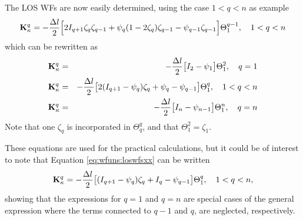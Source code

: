 The LOS WFs are now easily determined, using the case $1<q<n$ as example
 \begin{equation}
   \mathbf{K}_{\kappa}^q = -\frac{\Delta l}{2} \Big[ 2I_{q+1}\zeta_q\zeta_{q-1}+
     \psi_q(1-2\zeta_q)\zeta_{q-1} - \psi_{q-1}\zeta_{q-1} \Big] \Theta^{q-1}_1, 
     \quad 1<q<n
 \end{equation}
 which can be rewritten as
 \begin{eqnarray}
   \mathbf{K}_{\kappa}^q &=& -\frac{\Delta l}{2} \big[ I_2-\psi_1 \big] \Theta^2_1, \quad q=1 \nonumber \\
   \mathbf{K}_{\kappa}^q &=& -\frac{\Delta l}{2} \big[ 2(I_{q+1}-\psi_q)\zeta_q+
           \psi_q-\psi_{q-1} \big] \Theta^q_1, \quad 1<q<n 
  \label{eq:wfuns:loswfsxx} \\
   \mathbf{K}_{\kappa}^q &=& -\frac{\Delta l}{2} \big[ I_n-\psi_{n-1} \big] \Theta^n_1, \quad q=n \nonumber
 \end{eqnarray}
 Note that one $\zeta_q$ is incorporated in $\Theta^q_q$, and that 
 $\Theta^2_1=\zeta_1$.
 
 These equations are used for the practical calculations, but it could
 be of interest to note that Equation \ref{eq:wfuns:loswfsxx} can be
 written
 \begin{equation}
   \mathbf{K}_{\kappa}^q = -\frac{\Delta l}{2} \big[ (I_{q+1}-\psi_q)\zeta_q+
           I_q-\psi_{q-1} \big] \Theta^q_1, \quad 1<q<n ,
 \end{equation}
 showing that the expressions for $q=1$ and $q=n$ are special cases of
 the general expression where the terms connected to $q-1$ and $q$,
 are neglected, respectively.
 
